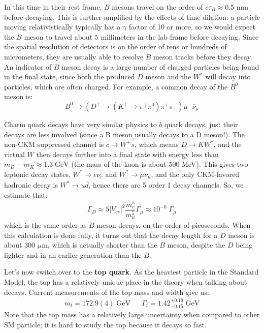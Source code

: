 \documentclass[11pt, oneside]{article}   	%
\theoremstyle{definition}
\numberwithin{equation}{subsection}		%
\begin{document}
In this time in their rest frame, $B$ mesons travel on the order of $c\tau_B \approx 0.5$ mm before decaying. This is further amplified by the 
effects of time dilation: a particle moving relativistically typically has a $\gamma$ factor of 10 or more, so we would expect the $B$ meson 
to travel about $5$ millimeters in the lab frame before decaying. Since the spatial resolution of detectors is on the order of tens or 
hundreds of micrometers, they are usually able to resolve $B$ meson tracks before they decay. An indicator of $B$ meson decay is 
a large number of charged particles being found in the final state, since both the produced $D$ meson and the $W^*$ will decay into 
particles, which are often charged. For example, a common decay of the $B^0$ meson is:
\begin{equation}
	B^0\rightarrow (D^+\rightarrow (K^+\rightarrow\pi^+\pi^0) \pi^+\pi^-)\mu^-\overline \nu_\mu
\end{equation}

Charm quark decays have very similar physics to $b$ quark decays, just their decays are less involved (since a B meson usually 
decays to a D meson!). The non-CKM suppressed channel is $c\rightarrow W^+ s$, which means $D\rightarrow K W^*$, and 
the virtual $W$ then decays further into a final state with energy less than $m_D - m_K \approx 1.3\;\mathrm{GeV}$ (the mass of the 
kaon is about $500$ MeV). This gives two leptonic decay states, $W^*\rightarrow e\nu_e$ and $W^*\rightarrow \mu\nu_\mu$, and 
the only CKM-favored hadronic decay is $W^*\rightarrow u\overline d$, hence there are 5 order 1 decay channels. So, we estimate that:
\begin{equation}
	\Gamma_D\approx 5 |V_{cs}|^2 \frac{m_c^5}{m_\mu^5} \Gamma_\mu\approx 10^{-6}\;\Gamma_\mu
\end{equation}
which is the same order as $B$ meson decays, on the order of picoseconds. When this calculation is done fully, it turns out that 
the decay length for a $D$ meson is about 300 $\mu$m, which is actually shorter than the $B$ meson, despite the $D$ being 
lighter and in an earlier generation than the $B$.

Let's now switch over to the \textbf{top quark}. As the heaviest particle in the Standard Model, the top has a relatively unique place in the 
theory when talking about decays. Current measurements of the top mass and width give us:
\begin{align}
	m_t = 172.9(4) \;\mathrm{GeV} && \Gamma_t = 1.42^{+0.19}_{-0.15} \;\mathrm{GeV}
\end{align}
Note that the top mass has a relatively large uncertainty when compared to other SM particle; it is hard to study the top because it decays so 
fast. 
\end{document}
